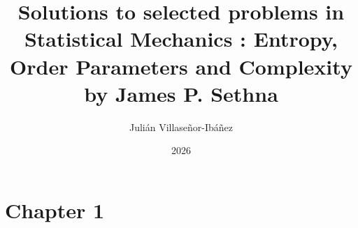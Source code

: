 \documentclass{article}
\title{Solutions to selected problems in Statistical Mechanics : Entropy, Order Parameters and Complexity by James P. Sethna}
\author{Julián Villaseñor-Ibáñez}
\date{2026}
\begin{document}
\maketitle

\section{Chapter 1}

\end{document}
